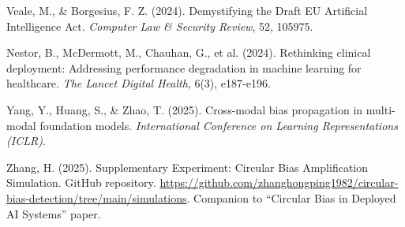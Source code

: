 \documentclass[11pt,a4paper]{article}
\begin{document}
\begin{thebibliography}{99}
Veale, M., \& Borgesius, F. Z. (2024). Demystifying the Draft EU Artificial Intelligence Act. \textit{Computer Law \& Security Review}, 52, 105975.

Nestor, B., McDermott, M., Chauhan, G., et al. (2024). Rethinking clinical deployment: Addressing performance degradation in machine learning for healthcare. \textit{The Lancet Digital Health}, 6(3), e187-e196.

Yang, Y., Huang, S., \& Zhao, T. (2025). Cross-modal bias propagation in multi-modal foundation models. \textit{International Conference on Learning Representations (ICLR)}.

Zhang, H. (2025). Supplementary Experiment: Circular Bias Amplification Simulation. GitHub repository. \url{https://github.com/zhanghongping1982/circular-bias-detection/tree/main/simulations}. Companion to ``Circular Bias in Deployed AI Systems'' paper.

\end{thebibliography}
\end{document}
